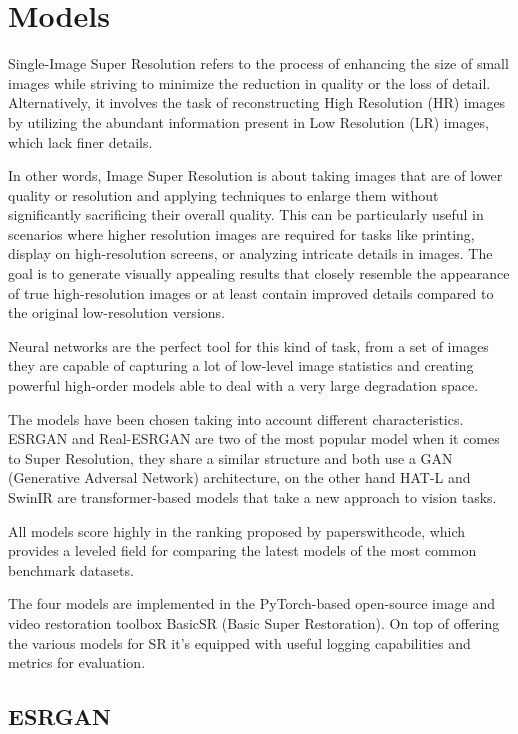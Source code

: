 \chapter{Models}
\label{cha:models}

Single-Image Super Resolution refers to the process of enhancing the size of small images while striving to minimize the reduction in quality or the loss of detail. Alternatively, it involves the task of reconstructing High Resolution (HR) images by utilizing the abundant information present in Low Resolution (LR) images, which lack finer details.

In other words, Image Super Resolution is about taking images that are of lower quality or resolution and applying techniques to enlarge them without significantly sacrificing their overall quality. This can be particularly useful in scenarios where higher resolution images are required for tasks like printing, display on high-resolution screens, or analyzing intricate details in images. The goal is to generate visually appealing results that closely resemble the appearance of true high-resolution images or at least contain improved details compared to the original low-resolution versions.

Neural networks are the perfect tool for this kind of task, from a set of images they are capable of capturing a lot of low-level image statistics and creating powerful high-order models able to deal with a very large degradation space.

The models have been chosen taking into account different characteristics. ESRGAN and Real-ESRGAN are two of the most popular model when it comes to Super Resolution, they share a similar structure and both use a GAN (Generative Adversal Network) architecture, on the other hand HAT-L and SwinIR are transformer-based models that take a new approach to vision tasks.

All models score highly in the ranking proposed by paperswithcode\cite{pwcode}, which provides a leveled field for comparing the latest models of the most common benchmark datasets.

The four models are implemented in the PyTorch-based open-source image and video restoration toolbox BasicSR (Basic Super Restoration). On top of offering the various models for SR it's equipped with useful logging capabilities and metrics for evaluation.


\section{ESRGAN}
\label{subsec:esrgan}

